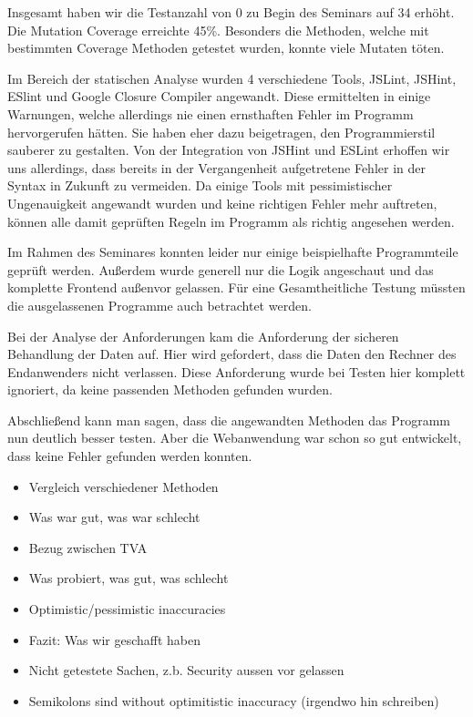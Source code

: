 \documentclass[ngerman]{article}
\begin{document}
Insgesamt haben wir die Testanzahl von 0 zu Begin des Seminars auf 34 erhöht. Die Mutation Coverage erreichte 45\%. Besonders die Methoden, welche mit bestimmten Coverage Methoden getestet wurden, konnte viele Mutaten töten.

Im Bereich der statischen Analyse wurden 4 verschiedene Tools, JSLint, JSHint, ESlint und Google Closure Compiler angewandt. Diese ermittelten in einige Warnungen, welche allerdings nie einen ernsthaften Fehler im Programm hervorgerufen hätten. Sie haben eher dazu beigetragen, den Programmierstil sauberer zu gestalten. Von der Integration von JSHint und ESLint erhoffen wir uns allerdings, dass bereits in der Vergangenheit aufgetretene Fehler in der Syntax in Zukunft zu vermeiden. Da einige Tools mit pessimistischer Ungenauigkeit angewandt wurden und keine richtigen Fehler mehr auftreten, können alle damit geprüften Regeln im Programm als richtig angesehen werden.

Im Rahmen des Seminares konnten leider nur einige beispielhafte Programmteile geprüft werden. Außerdem wurde generell nur die Logik angeschaut und das komplette Frontend außenvor gelassen. Für eine Gesamtheitliche Testung müssten die ausgelassenen Programme auch betrachtet werden.

Bei der Analyse der Anforderungen kam die Anforderung der sicheren Behandlung der Daten auf. Hier wird gefordert, dass die Daten den Rechner des Endanwenders nicht verlassen. Diese Anforderung wurde bei Testen hier komplett ignoriert, da keine passenden Methoden gefunden wurden.

Abschließend kann man sagen, dass die angewandten Methoden das Programm nun deutlich besser testen.
Aber die Webanwendung war schon so gut entwickelt, dass keine Fehler gefunden werden konnten.

\begin{itemize}
    \item Vergleich verschiedener Methoden
    \item Was war gut, was war schlecht
    \item Bezug zwischen TVA
    \item Was probiert, was gut, was schlecht
    \item Optimistic/pessimistic inaccuracies
    \item Fazit: Was wir geschafft haben
    \item Nicht getestete Sachen, z.b. Security aussen vor gelassen
    \item Semikolons sind without optimitistic inaccuracy (irgendwo hin schreiben)
\end{itemize}
\end{document}
